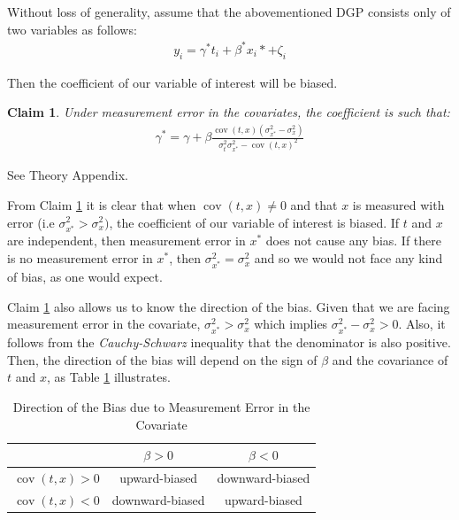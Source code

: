 \documentclass[10pt]{article}
\makeatletter
\newtheorem{claim}{Claim}
\def\b{\beta}
\renewenvironment{proof}[1][\proofname] {\par\pushQED{\qed}\normalfont\topsep6\p@\@plus6\p@\relax\trivlist\item[\hskip\labelsep\bfseries#1\@addpunct{.}]\ignorespaces}{\popQED\endtrivlist\@endpefalse}
\makeatother
\begin{document}
        Without loss of generality, assume that the abovementioned DGP consists only of two variables as follows:
        \begin{align}
                    y_i = \gamma^* t_i +  \beta^*x_i* + \zeta_i
        \end{align}
        
        Then the coefficient of our variable of interest will be biased.
        \begin{claim}
        \label{claim:one}
        Under measurement error in the covariates, the coefficient is such that:
            \begin{align}
                \gamma^* = \gamma + \beta\frac{\operatorname{cov}(t,x)(\sigma^2_{x^*}-\sigma^2_x)}{\sigma_{t}^2\sigma_{x^*}^2-\operatorname{cov}({t,x})^2}
            \end{align}
        \end{claim}

        \begin{proof}
            See Theory Appendix.
        \end{proof}

       From Claim \ref{claim:one} it is clear that when $\operatorname{cov}(t,x)\neq 0$ and that $x$ is measured with error (i.e $\sigma_{x^*}^2>\sigma_x^2)$, the coefficient of our variable of interest is biased. If $t$ and $x$ are independent, then measurement error in $x^*$ does not cause any bias. If there is no measurement error in $x^*$, then $\sigma^2_{x^*}=\sigma^2_x$ and so we would not face any kind of bias, as one would expect.
        
        Claim \ref{claim:one} also allows us to know the direction of the bias. Given that we are facing measurement error in the covariate, $\sigma^2_{x^*}>\sigma^2_x$ which implies $\sigma^2_{x^*}-\sigma^2_x>0$. Also, it follows from the \textit{Cauchy-Schwarz} inequality that the denominator is also positive. Then, the direction of the bias will depend on the sign of $\beta$ and the covariance of $t$ and $x$, as Table \ref{bias_direction} illustrates.
        
        \begin{table}[H]
            \centering
            \caption{Direction of the Bias due to Measurement Error in the Covariate}
            \label{bias_direction}
            \begin{tabular}{|c|c|c|}\hline \hline
              & $\b>0$  & $\b<0$ \\ \hline
             $\operatorname{cov}(t,x)>0$ & upward-biased & downward-biased \\ \hline
             $\operatorname{cov}(t,x)<0$ & downward-biased & upward-biased \\ \hline
            \end{tabular} 
        \end{table}
        
\end{document}
